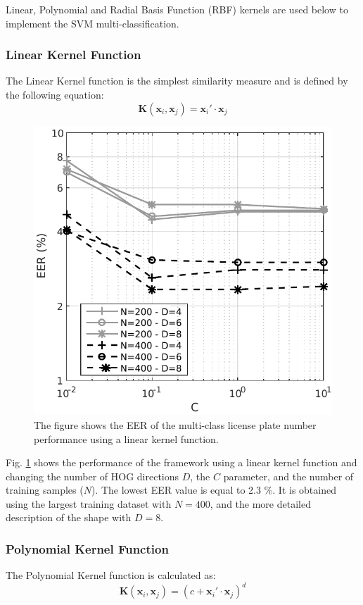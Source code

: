 \documentclass{ipol}
\def\x{{\mathbf x}}
\def\K{{\mathbf K}}
\begin{document}
Linear, Polynomial and Radial Basis Function (RBF) kernels are used below to implement the SVM multi-classification.

\subsubsection*{Linear Kernel Function}

The Linear Kernel function is the simplest similarity measure and is defined by the following equation:
\begin{equation}\label{eq:linkernel}
\K(\x_i,\x_j) = \x_i' \cdot \x_j
\end{equation}

\begin{figure}[!htbp]
	\begin{center}
			\includegraphics[width=.45\linewidth]{linear_results.pdf}
		\caption{The figure shows the EER of the multi-class license plate number performance using a linear kernel function.}
				\label{fig:linearRes}
	\end{center}
\end{figure}

Fig. \ref{fig:linearRes} shows the performance of the framework using a linear kernel function and changing the number of HOG directions $D$, the $C$ parameter, and the number of training samples ($N$).
The lowest EER value is equal to 2.3 \%.
It is obtained using the largest training dataset with $N=400$, and the more detailed description of the shape with $D=8$.

\subsubsection*{Polynomial Kernel Function}

The Polynomial Kernel function is calculated as:
\begin{equation}
\K(\x_i,\x_j) = (c + \x_i' \cdot \x_j)^d
\end{equation}
\end{document}
